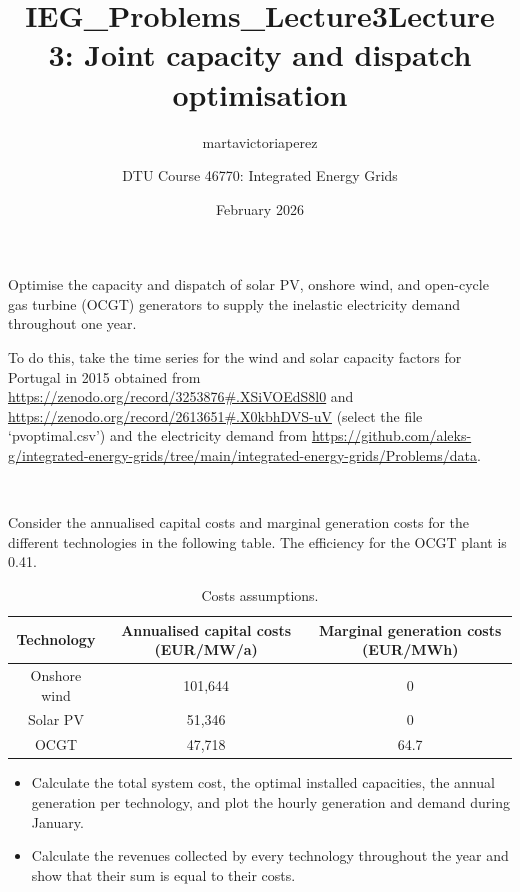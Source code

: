 \documentclass[10pt]{article}
\title{IEG_Problems_Lecture3}
\author{martavictoriaperez}
\date{February 2026}
\newenvironment{problem}[2][Problem]{\begin{trivlist}
\item[\hskip \labelsep {\bfseries #1}\hskip \labelsep {\bfseries #2.}]}{\end{trivlist}}
\begin{document}
 
\title{\textbf{Lecture 3: Joint capacity and dispatch optimisation}}
\author{
DTU Course 46770: Integrated Energy Grids }
\maketitle

\begin{problem}{3.1}

Optimise the capacity and dispatch of solar PV, onshore wind, and open-cycle gas turbine (OCGT) generators to supply the inelastic electricity demand throughout one year. 

To do this, take the time series for the wind and solar capacity factors for Portugal in 2015 obtained from \url{https://zenodo.org/record/3253876#.XSiVOEdS8l0}
and \url{https://zenodo.org/record/2613651#.X0kbhDVS-uV} (select the file ‘pvoptimal.csv’) and the electricity demand from \url{https://github.com/aleks-g/integrated-energy-grids/tree/main/integrated-energy-grids/Problems/data}.

\

Consider the annualised capital costs and marginal generation costs for the different technologies in the following table. The efficiency for the OCGT plant is 0.41.


\begin{table}[h]
    \centering
    \begin{tabular}{ccc}
    \hline
        Technology & Annualised capital costs (EUR/MW/a) & Marginal generation costs (EUR/MWh) \\
    \hline
    Onshore wind &  101,644 & 0 \\
         Solar PV &  51,346 & 0 \\
         OCGT & 47,718 &  64.7  \\
    \hline
    \end{tabular}
    \caption{Costs assumptions.}
    \label{tab:my_label}
\end{table}
\begin{itemize}
\item[a)] Calculate the total system cost, the optimal installed capacities, the annual generation per technology, and plot the hourly generation and demand during January.
\item[b)] Calculate the revenues collected by every technology throughout the year and show that their sum is equal to their costs. 
\end{itemize}


\end{problem}
\end{document}
